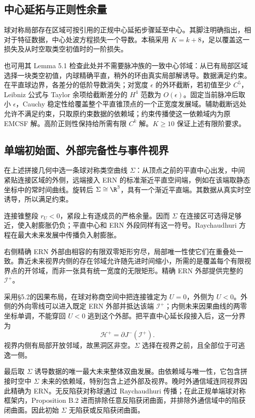 \subsection{中心延拓与正则性余量}
球对称局部存在区域可按\cite[§5.2]{KU}引用的正规中心延拓步骤延至中心。其脚注明确指出，相对于特征数据，中心处波方程损失一个导数。本稿采用 $K=k+8$，足以覆盖这一损失及从时空取类空初值时的一阶损失。

也可用其 Lemma 5.1 检查此处并不需要脉冲族的一致中心邻域：从已有局部区域选择一块类空初值，内球精确平直，稍外的环由真实局部解诱导。数据满足约束。在平直球边界，各差分的低阶导数消失；对宽度 $\epsilon$ 的外环截断，若初值至少 $C^5$，Leibniz 公式与 Taylor 余项给截断差分的 $H^4$ 范数为 $O(\epsilon)$。固定当前脉冲后取小 $\epsilon$，Cauchy 稳定性给覆盖整个平直锥顶点的一个正宽度发展域。辅助截断远处允许不满足约束，只取原约束数据的依赖域；约束传播使这一依赖域内为原 EMCSF 解。高阶正则性保持给所需有限 $C^k$ 解。$K\ge10$ 保证上述有限阶要求。

\subsection{单端初始面、外部完备性与事件视界}
在上述拼接几何中选一条球对称类空曲线 $\Sigma$：从顶点之前的平直中心出发，中间紧贴连接区域的外侧，远端接入 ERN 的标准渐近平直空间端，例如在该端取静态坐标中的常时间曲线。旋转后 $\Sigma\cong\R^3$，具有一个渐近平直端。其数据从真实时空诱导，所以满足约束。

连接锥整段 $r_U<0$，紧段上有逐成员的严格余量。因而 $\Sigma$ 在连接区可选得足够近，使入射膨胀仍负；平直中心和 ERN 外段同样有这一符号。Raychaudhuri 方程在最大未来发展中传播负入射膨胀。

右侧精确 ERN 外部由相容的有限双零矩形穷尽，局部唯一性使它们在重叠处一致。靠近未来视界内侧的存在邻域允许随先进时间缩小，所需的是覆盖每个有限视界点的开邻域，而非一张具有统一宽度的无限矩形。精确 ERN 外部提供完整的 $\mathcal I^+$。

采用§5.2的因果布局，在球对称商空间中把连接锥定为 $U=0$，外侧为 $U<0$。外侧的外向零线可以进入既定 ERN 外部并抵达该端 $\mathcal I^+$；内侧未来因果曲线的两零坐标单调，不能穿回 $U<0$ 逃到这个外部。把平直中心延长段接入后，这一分界为
\[
\mathcal H^+=\partial J^-(\mathcal I^+).
\]
视界内侧有局部开放邻域，故黑洞区非空。$\Sigma$ 选择在视界之前，且全部位于可逃逸一侧。

最后取 $\Sigma$ 诱导数据的唯一最大未来整体双曲发展。由依赖域与唯一性，它包含拼接时空中 $\Sigma$ 未来的依赖域，特别包含上述外部及视界。晚时外通信域连同视界因此精确为 ERN。无反陷获对称球通过 Raychaudhuri 传播；在此正规单端球对称框架内，Proposition B.2 进而排除任意反陷获闭曲面，并排除外通信域中的陷获闭曲面。因此初始 $\Sigma$ 无陷获或反陷获闭曲面。

